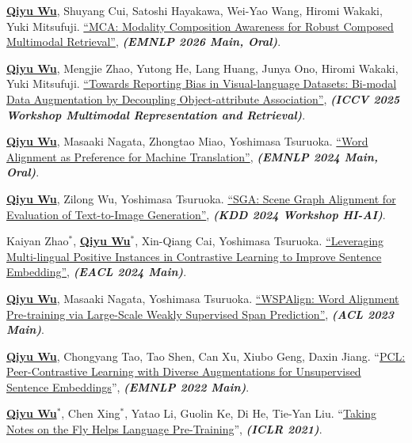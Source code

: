 \documentclass[10pt, letterpaper]{article}
\begin{document}
      \begin{description}[leftmargin=3.5em,labelwidth=3em,labelsep=0.5em,topsep=0.10cm,itemsep=0.10cm,parsep=0pt]
        \item [{[F10]}] \underline{\textbf{Qiyu Wu}}, Shuyang Cui, Satoshi Hayakawa, Wei-Yao Wang, Hiromi Wakaki, Yuki Mitsufuji. \href{https://arxiv.org/abs/2510.15543}{``MCA: Modality Composition Awareness for Robust Composed Multimodal Retrieval''}, \textit{\textbf{(EMNLP 2026 Main, Oral)}}.
        \item [{[F9]}] \underline{\textbf{Qiyu Wu}}, Mengjie Zhao, Yutong He, Lang Huang, Junya Ono, Hiromi Wakaki, Yuki Mitsufuji. \href{https://arxiv.org/abs/2310.01330}{``Towards Reporting Bias in Visual-language Datasets: Bi-modal Data Augmentation by Decoupling Object-attribute Association''}, \textit{\textbf{(ICCV 2025 Workshop Multimodal Representation and Retrieval)}}.
        \item [{[F8]}] \underline{\textbf{Qiyu Wu}}, Masaaki Nagata, Zhongtao Miao, Yoshimasa Tsuruoka. \href{https://arxiv.org/abs/2405.09223}{``Word Alignment as Preference for Machine Translation''}, \textit{\textbf{(EMNLP 2024 Main, Oral)}}.
        \item [{[F7]}] \underline{\textbf{Qiyu Wu}}, Zilong Wu, Yoshimasa Tsuruoka. \href{https://human-interpretable-ai.github.io/assets/pdf/10_SGA_Scene_Graph_Alignment_f.pdf}{``SGA: Scene Graph Alignment for Evaluation of Text-to-Image Generation''}, \textit{\textbf{(KDD 2024 Workshop HI-AI)}}.
        \item [{[F6]}] Kaiyan Zhao$^*$, \underline{\textbf{Qiyu Wu}$^*$}, Xin-Qiang Cai, Yoshimasa Tsuruoka. \href{https://arxiv.org/abs/2309.08929}{``Leveraging Multi-lingual Positive Instances in Contrastive Learning to Improve Sentence Embedding''}, \textit{\textbf{(EACL 2024 Main)}}.
        \item [{[F5]}] \underline{\textbf{Qiyu Wu}}, Masaaki Nagata, Yoshimasa Tsuruoka. \href{https://arxiv.org/abs/2306.05644}{``WSPAlign: Word Alignment Pre-training via Large-Scale Weakly Supervised Span Prediction''}, \textit{\textbf{(ACL 2023 Main)}}.
        \item [{[F4]}] \underline{\textbf{Qiyu Wu}}, Chongyang Tao, Tao Shen, Can Xu, Xiubo Geng, Daxin Jiang. ``\href{https://aclanthology.org/2022.emnlp-main.826.pdf}{PCL: Peer-Contrastive Learning with Diverse Augmentations for Unsupervised Sentence Embeddings}'', \textit{\textbf{(EMNLP 2022 Main)}}.
        \item [{[F3]}] \underline{\textbf{Qiyu Wu}$^*$}, Chen Xing$^*$, Yatao Li, Guolin Ke, Di He, Tie-Yan Liu. ``\href{https://openreview.net/forum?id=lU5Rs_wCweN}{Taking Notes on the Fly Helps Language Pre-Training}'', \textit{\textbf{(ICLR 2021)}}.

\end{description}
\end{document}
